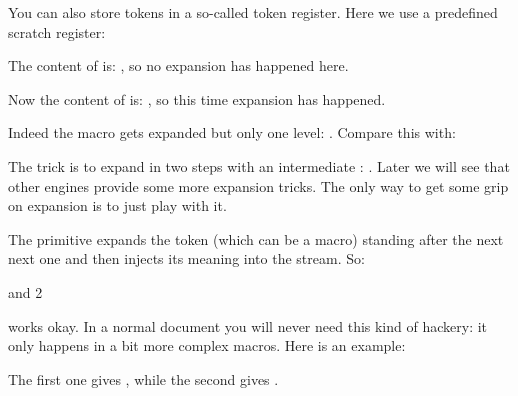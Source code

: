 You can also store tokens in a so-called token register. Here we use a predefined
scratch register:

\startbuffer
\def\MyMacroA{ and }
\def\MyMacroB{1\MyMacroA 2}
\scratchtoks {\MyMacroA}
\stopbuffer

\typebuffer[option=TEX]

The content of \type {\scratchtoks} is: \MyShow, so no expansion has happened
here.

\startbuffer
\def\MyMacroA{ and }
\def\MyMacroB{1\MyMacroA 2}
\scratchtoks \expandafter {\MyMacroA}
\stopbuffer

\typebuffer[option=TEX]

Now the content of \type {\scratchtoks} is: \MyShow, so this time expansion has
happened.

\startbuffer
\def\MyMacroA{ and }
\def\MyMacroB{1\MyMacroA 2}
\scratchtoks \expandafter {\MyMacroB}
\stopbuffer

\typebuffer[option=TEX]

Indeed the macro gets expanded but only one level: \MyShow. Compare this with:

\startbuffer
\def\MyMacroA{ and }
\edef\MyMacroB{1\MyMacroA 2}
\scratchtoks \expandafter {\MyMacroB}
\stopbuffer

\typebuffer[option=TEX]

The trick is to expand in two steps with an intermediate \type {\edef}: \MyShow. Later we will see that other
engines provide some more expansion tricks. The only way to get some grip on
expansion is to just play with it.

The \type {\expandafter} primitive expands the token (which can be a macro) standing after
the next next one and then injects its meaning into the stream. So:

\starttyping[option=TEX]
\expandafter \MyMacroA \MyMacroB
\stoptyping

works okay. In a normal document you will never need this kind of hackery: it
only happens in a bit more complex macros. Here is an example:

\startbuffer[a]
\bgroup
\advance{}
\egroup
\the\scratchcounter
\stopbuffer

\typebuffer[a][option=TEX]

\startbuffer[b]
\bgroup
\advance{}
\expandafter
\egroup
\the\scratchcounter
\stopbuffer

\typebuffer[b][option=TEX]

The first one gives \inlinebuffer[a], while the second gives \inlinebuffer[b].

